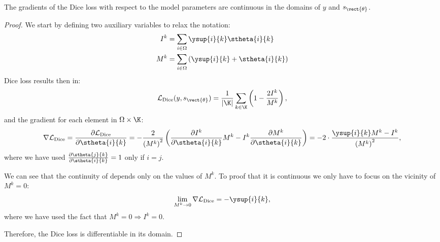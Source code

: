 \begin{theorem}
    The gradients of the Dice loss with respect to the model parameters are continuous in the domains of $y$ and $s_{\vect{\theta}}$.
\end{theorem}
\begin{proof}
    We start by defining two auxiliary variables to relax the notation: 
    \begin{align*}
        I^k &= \sum_{i\in\Omega} \ysup{i}{k}\stheta{i}{k} \\
        M^k &= \sum_{i\in\Omega}\left(\ysup{i}{k} + \stheta{i}{k}\right)
    \end{align*}
    Dice loss results then in:
    \begin{equation*}
        \mathcal{L}_\text{Dice}(y, s_{\vect{\theta}}) = \dfrac{1}{|\K|}\sum_{k\in\K}\left(1 - \dfrac{2I^k}{M^k}\right),
    \end{equation*}
    and the gradient for each element in $\Omega\times \K$:
    \begin{equation}
        \nabla \mathcal{L}_\text{Dice} = \dfrac{\partial \mathcal{L}_\text{Dice}}{\partial \stheta{i}{k}} = - \dfrac{2}{\left(M^k\right)^2}\left( \dfrac{\partial I^k}{\partial \stheta{i}{k}} M^k - I^k \dfrac{\partial M^k}{\partial \stheta{i}{k}}\right) = -2 \cdot \dfrac{\ysup{i}{k}M^k - I^k}{\left(M^k\right)^2},
        \label{eq:app_diceloss_proof}
    \end{equation}
    where we have used $\frac{\partial \stheta{j}{k}}{\partial \stheta{i}{k}} = 1$ only if $i = j$.
    
    We can see that the continuity of  depends only on the values of $M^k$. To proof that it is continuous we only have to focus on the vicinity of $M^k = 0$:
    \begin{equation*}
        \lim_{M^k\rightarrow0}\nabla \mathcal{L}_\text{Dice} = - \ysup{i}{k},
    \end{equation*}
    where we have used the fact that $M^k= 0 \Rightarrow I^k= 0$.
    
    Therefore, the Dice loss is differentiable in its domain.    
\end{proof}

